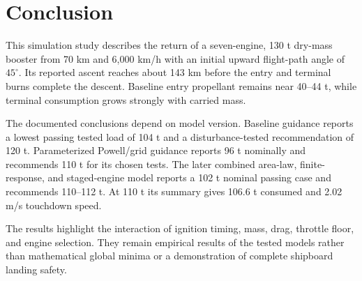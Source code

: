\documentclass[11pt,a4paper]{article}
\begin{document}
\section{Conclusion}
This simulation study describes the return of a seven-engine, 130 t dry-mass booster from 70 km and 6,000 km/h with an initial upward flight-path angle of $45^\circ$. Its reported ascent reaches about 143 km before the entry and terminal burns complete the descent. Baseline entry propellant remains near 40--44 t, while terminal consumption grows strongly with carried mass.

The documented conclusions depend on model version. Baseline guidance reports a lowest passing tested load of 104 t and a disturbance-tested recommendation of 120 t. Parameterized Powell/grid guidance reports 96 t nominally and recommends 110 t for its chosen tests. The later combined area-law, finite-response, and staged-engine model reports a 102 t nominal passing case and recommends 110--112 t. At 110 t its summary gives 106.6 t consumed and 2.02 m/s touchdown speed.

The results highlight the interaction of ignition timing, mass, drag, throttle floor, and engine selection. They remain empirical results of the tested models rather than mathematical global minima or a demonstration of complete shipboard landing safety.

\clearpage

\end{document}
